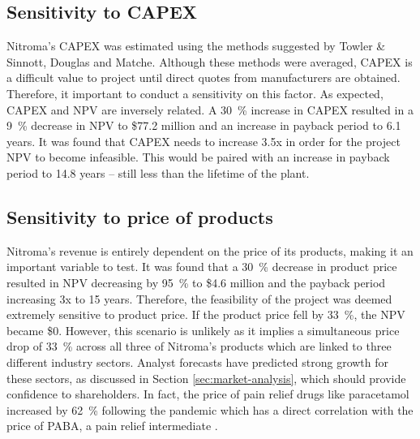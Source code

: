 \subsection{Sensitivity to CAPEX}
Nitroma’s CAPEX was estimated using the methods suggested by Towler \& Sinnott, Douglas and Matche. Although these methods were averaged, CAPEX is a difficult value to project until direct quotes from manufacturers are obtained. Therefore, it important to conduct a sensitivity on this factor. As expected, CAPEX and NPV are inversely related. A \SI{30}{\percent} increase in CAPEX resulted in a \SI{9}{\percent} decrease in NPV to \$77.2 million and an increase in payback period to 6.1 years. It was found that CAPEX needs to increase 3.5x in order for the project NPV to become infeasible. This would be paired with an increase in payback period to 14.8 years – still less than the lifetime of the plant.

\subsection{Sensitivity to price of products}
Nitroma’s revenue is entirely dependent on the price of its products, making it an important variable to test. It was found that a \SI{30}{\percent} decrease in product price resulted in NPV decreasing by \SI{95}{\percent} to \$4.6 million and the payback period increasing 3x to 15 years. Therefore, the feasibility of the project was deemed extremely sensitive to product price.  If the product price fell by \SI{33}{\percent}, the NPV became \$0. However, this scenario is unlikely as it implies a simultaneous price drop of \SI{33}{\percent} across all three of Nitroma’s products which are linked to three different industry sectors. Analyst forecasts have predicted strong growth for these sectors, as discussed in Section \ref{sec:market-analysis}, which should provide confidence to shareholders. In fact, the price of pain relief drugs like paracetamol increased by \SI{62}{\percent} following the pandemic which has a direct correlation with the price of PABA, a pain relief intermediate \cite{beroe_inc_coronavirus_2020}.

